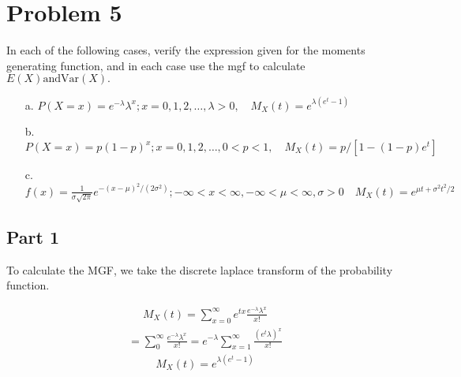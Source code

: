 \documentclass{article}
\begin{document}
\section*{Problem 5}

  In each of the following cases, verify the expression given for the moments generating function, and in each case use the mgf to calculate $E(X)  \textrm{and} \textrm{Var}(X).$
    \begin{enumerate}
    \item[a.]
      $P(X = x) = e^{-\lambda}\lambda^x;x=0,1,2,\dots,\lambda > 0, \quad M_X(t) = e^{\lambda(e^t-1)}$
    \item[b.]
      $P(X = x) = p(1-p)^x;x=0,1,2,\dots,0 < p < 1, \quad M_X(t) = p/[1-(1-p)e^t]$
    \item[c.]
      $f(x) = \frac{1}{\sigma\sqrt{2\pi}}e^{-(x-\mu)^2/(2\sigma^2)};-\infty < x< \infty,  -\infty < \mu < \infty, \sigma > 0 \quad M_X(t) = e^{\mu t + \sigma^2t^2/2}$
    \end{enumerate}
    \clearpage


\subsection*{Part 1}
To calculate the MGF, we take the discrete laplace transform of the probability function.

\begin{align*}
M_X(t) = \sum_{x=0}^{\infty} e^{t x}\frac{e^{-\lambda} \lambda^x}{x!}
\end{align*}
\begin{align*}
 = \sum_{0}^{\infty} \frac{e^{-\lambda} \lambda^x}{x!} = e^{-\lambda}\sum_{x=1}^{\infty} \frac{(e^t \lambda)^x}{x!}
\end{align*}
\begin{align*}
M_X(t) = e^{\lambda(e^t-1)}
\end{align*}
\end{document}
